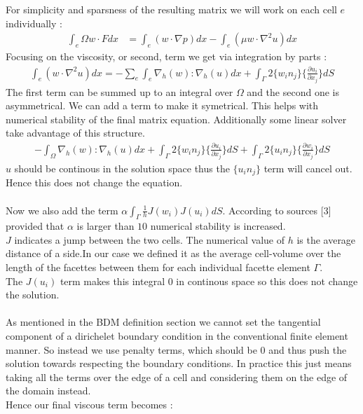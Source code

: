 \documentclass[11pt,twoside,a4paper]{article}
\begin{document}
For simplicity and sparsness of the resulting matrix we will work on each cell $e$ individually : 
\begin{align*}
\int_e\Omega w \cdot F dx &= \int_e (w \cdot \nabla p) dx - \int_e (\mu w \cdot \nabla^2 u) dx
\end{align*}
Focusing on the viscosity, or second, term we get via integration by parts :
\begin{align*}
\int_e (w \cdot \nabla^2 u) dx = - \sum_e \int_e \nabla_h(w) : \nabla_h(u) dx + \int_\Gamma 2 \{ w_i n_j \} \{ \frac{\partial u_i}{\partial x_j}\} dS
\end{align*}
The first term can be summed up to an integral over $\Omega$ and the second one is asymmetrical. We can add a term to make it symetrical. This helps with numerical stability of the final matrix equation. Additionally some linear solver take advantage of this structure.
\begin{align*}
-  \int_\Omega \nabla_h(w) : \nabla_h(u) dx + \int_\Gamma 2 \{ w_i n_j \} \{ \frac{\partial u_i}{\partial x_j}\} dS + \int_\Gamma 2 \{ u_i n_j \} \{ \frac{\partial w_i}{\partial x_j}\} dS
\end{align*}
$u$ should be continous in the solution space thus the $ \{ u_i n_j \}$ term will cancel out. Hence this does not change the equation.\\
\\
Now we also add the term $\alpha \int_\Gamma \frac{1}{h}  J(w_i) J(u_i) dS$. According to sources [3] provided that  $\alpha$ is larger than $10$ numerical stability is increased.\\
$J$ indicates a jump between the two cells. The numerical value of $h$ is the average distance of a side.In our case we defined it as the average cell-volume over the length of the facettes between them for each individual facette element $\Gamma$.\\
The $J(u_i)$ term makes this integral $0$ in continous space so this does not change the solution.\\
\\
As mentioned in the BDM definition section we cannot set the tangential component of a dirichelet boundary condition in the conventional finite element manner.  So instead we use penalty terms, which should be $0$ and thus push the solution towards respecting the boundary conditions. In practice this just means taking all the terms over the edge of a cell and considering them on the edge of the domain instead.\\
 Hence our final viscous term becomes :\\
\end{document}
